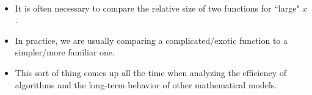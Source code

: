 \setcounter{chapter}{7}
\setcounter{section}{8}
\setcounter{theorem}{0}
\setcounter{equation}{0}


\begin{remark}\,
\begin{itemize}
\item It is often necessary to compare the relative size of two functions for ``large" $x$.
\item In practice, we are usually comparing a complicated/exotic function to a simpler/more familiar one.
\item This sort of thing comes up all the time when analyzing the efficiency of algorithms and the long-term behavior of other mathematical models.
\end{itemize}
\end{remark}

